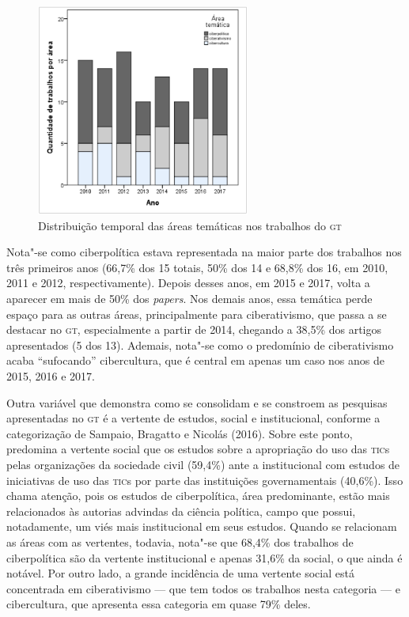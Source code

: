  \begin{figure}[!ht]
 \centering
  \includegraphics[width=70mm]{./imgs/graf3_5.png}
 \caption{Distribuição temporal das áreas temáticas nos trabalhos do \textsc{gt}\footnotemark}
 \end{figure}


Nota"-se como ciberpolítica estava representada na maior parte dos
trabalhos nos três primeiros anos (66,7\% dos 15 totais, 50\% dos 14 e
68,8\% dos 16, em 2010, 2011 e 2012, respectivamente). Depois desses
anos, em 2015 e 2017, volta a aparecer em mais de 50\% dos
\textit{papers}. Nos demais anos, essa temática perde espaço para as
outras áreas, principalmente para ciberativismo, que passa a se destacar
no \textsc{gt}, especialmente a partir de 2014, chegando a 38,5\% dos artigos
apresentados (5 dos 13). Ademais, nota"-se como o predomínio de
ciberativismo acaba ``sufocando'' cibercultura, que é central em apenas
um caso nos anos de 2015, 2016 e 2017.

Outra variável que demonstra como se consolidam e se constroem as
pesquisas apresentadas no \textsc{gt} é a vertente de estudos, social e
institucional, conforme a categorização de Sampaio, Bragatto e Nicolás
(2016). Sobre este ponto, predomina a vertente social que os estudos
sobre a apropriação do uso das \textsc{tic}s pelas organizações da sociedade
civil (59,4\%) ante a institucional com estudos de iniciativas de uso
das \textsc{tic}s por parte das instituições governamentais (40,6\%). Isso chama
atenção, pois os estudos de ciberpolítica, área predominante, estão mais
relacionados às autorias advindas da ciência política, campo que possui,
notadamente, um viés mais institucional em seus estudos. Quando se
relacionam as áreas com as vertentes, todavia, nota"-se que 68,4\% dos
trabalhos de ciberpolítica são da vertente institucional e apenas 31,6\%
da social, o que ainda é notável. Por outro lado, a grande incidência de
uma vertente social está concentrada em ciberativismo --- que tem todos
os trabalhos nesta categoria --- e cibercultura, que apresenta essa
categoria em quase 79\% deles.

